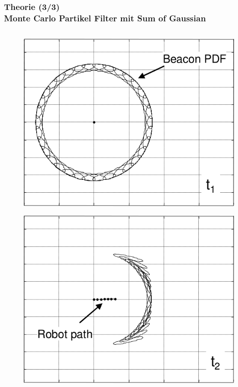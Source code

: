 \documentclass{beamer}
\begin{document}
%
%
\begin{frame}
	\frametitle{Theorie (3/3)\\Monte Carlo Partikel Filter mit Sum of Gaussian}
	\begin{columns}
			\begin{overlayarea}{\textwidth}{.9\textheight}
				\only<1>
				{
					\begin{figure}
						\centering
						\includegraphics[width=\linewidth]{blanco2008efficient_fig3_1}
						\caption{\cite{blanco2008efficient}}
					\end{figure}
				}
				{
					\begin{figure}
						\centering
						\includegraphics[width=\linewidth]{blanco2008efficient_fig3_2}

\end{figure}}
\end{overlayarea}
\end{columns}
\end{frame}
\end{document}
